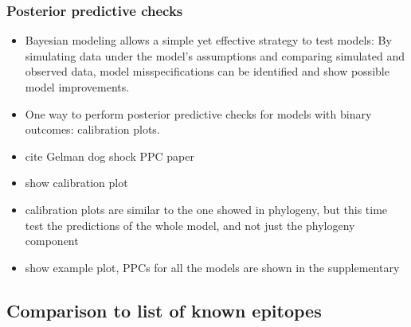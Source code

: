 \documentclass[fleqn,11pt]{SelfArx} %
\begin{document}
\subsubsection*{Posterior predictive checks}

\begin{itemize}
  \item Bayesian modeling allows a simple yet effective strategy to test models: By simulating data under the model's assumptions and comparing simulated and observed data, model misspecifications can be identified and show possible model improvements.
  \item One way to perform posterior predictive checks for models with binary outcomes: calibration plots.
  \item cite Gelman dog shock PPC paper
  \item show calibration plot
  \item calibration plots are similar to the one showed in phylogeny, but this time test the predictions of the whole model, and not just the phylogeny component
  \item show example plot, PPCs for all the models are shown in the supplementary
\end{itemize}

\subsection*{Comparison to list of known epitopes}
\end{document}
